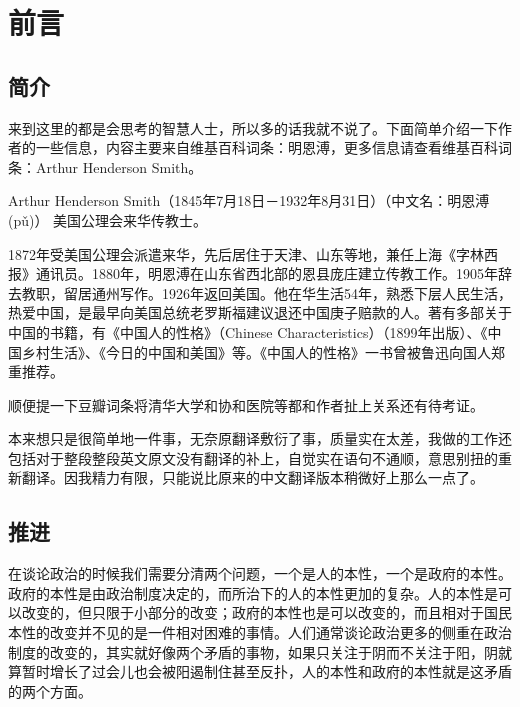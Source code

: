 \documentclass[12pt,oneside]{book}
\begin{document}
\frontmatter

\author{亚瑟·亨·史密斯}
\titleLA

\chapter*{前言}
\begin{common-format}
\section*{简介}
来到这里的都是会思考的智慧人士，所以多的话我就不说了。下面简单介绍一下作者的一些信息，内容主要来自维基百科词条：明恩溥，更多信息请查看维基百科词条：Arthur Henderson Smith。

Arthur Henderson Smith（1845年7月18日－1932年8月31日）（中文名：明恩溥(pǔ)） 美国公理会来华传教士。

1872年受美国公理会派遣来华，先后居住于天津、山东等地，兼任上海《字林西报》通讯员。1880年，明恩溥在山东省西北部的恩县庞庄建立传教工作。1905年辞去教职，留居通州写作。1926年返回美国。他在华生活54年，熟悉下层人民生活，热爱中国，是最早向美国总统老罗斯福建议退还中国庚子赔款的人。著有多部关于中国的书籍，有《中国人的性格》（Chinese Characteristics）（1899年出版）、《中国乡村生活》、《今日的中国和美国》等。《中国人的性格》一书曾被鲁迅向国人郑重推荐。

顺便提一下豆瓣词条将清华大学和协和医院等都和作者扯上关系还有待考证。

本来想只是很简单地一件事，无奈原翻译敷衍了事，质量实在太差，我做的工作还包括对于整段整段英文原文没有翻译的补上，自觉实在语句不通顺，意思别扭的重新翻译。因我精力有限，只能说比原来的中文翻译版本稍微好上那么一点了。

\section*{推进}
 在谈论政治的时候我们需要分清两个问题，一个是人的本性，一个是政府的本性。政府的本性是由政治制度决定的，而所治下的人的本性更加的复杂。人的本性是可以改变的，但只限于小部分的改变；政府的本性也是可以改变的，而且相对于国民本性的改变并不见的是一件相对困难的事情。人们通常谈论政治更多的侧重在政治制度的改变的，其实就好像两个矛盾的事物，如果只关注于阴而不关注于阳，阴就算暂时增长了过会儿也会被阳遏制住甚至反扑，人的本性和政府的本性就是这矛盾的两个方面。


\end{common-format}
\end{document}
